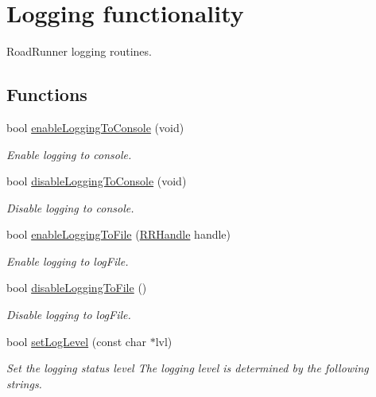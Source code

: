 \hypertarget{group__logging}{\section{Logging functionality}
\label{group__logging}
}


Road\+Runner logging routines.  


\subsection*{Functions}
\begin{DoxyCompactItemize}
\item 
bool \hyperlink{group__logging_ga1289bf0c4cc9c078d53d82b60e8dbdbb}{enable\+Logging\+To\+Console} (void)
\begin{DoxyCompactList}\small\item\em Enable logging to console. \end{DoxyCompactList}\item 
bool \hyperlink{group__logging_ga894d611c74147f5cd1dcb64c1a758b5e}{disable\+Logging\+To\+Console} (void)
\begin{DoxyCompactList}\small\item\em Disable logging to console. \end{DoxyCompactList}\item 
bool \hyperlink{group__logging_ga85cc1f6f174a51a4498b4a44313e8d18}{enable\+Logging\+To\+File} (\hyperlink{rrc__types_8h_a1d68f0592372208fa5a5f2799ea4b3ae}{R\+R\+Handle} handle)
\begin{DoxyCompactList}\small\item\em Enable logging to log\+File. \end{DoxyCompactList}\item 
bool \hyperlink{group__logging_gac1f91b27feb5ffdb19c6d54f3013d7e0}{disable\+Logging\+To\+File} ()
\begin{DoxyCompactList}\small\item\em Disable logging to log\+File. \end{DoxyCompactList}\item 
bool \hyperlink{group__logging_gad113b4e32a079d7a8c1d188561e1ffbc}{set\+Log\+Level} (const char $\ast$lvl)
\begin{DoxyCompactList}\small\item\em Set the logging status level The logging level is determined by the following strings. \end{DoxyCompactList}\item 

\end{DoxyCompactItemize}

